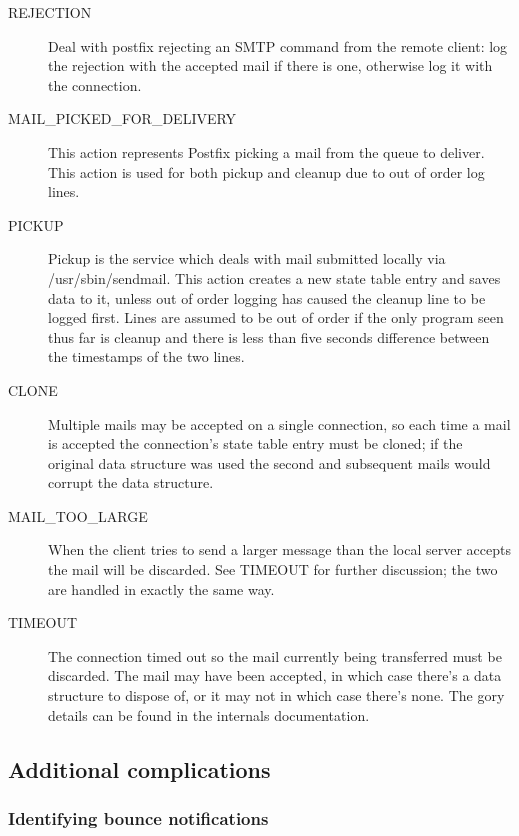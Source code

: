 \documentclass[a4paper,12pt,draft]{article}
\begin{document}
\begin{description}
    \item [REJECTION] Deal with postfix rejecting an SMTP command from the
        remote client: log the rejection with the accepted mail if there is
        one, otherwise log it with the connection.

    \item [MAIL\_PICKED\_FOR\_DELIVERY] This action represents Postfix
        picking a mail from the queue to deliver. This action is used for
        both pickup and cleanup due to out of order log lines.

    \item [PICKUP] Pickup is the service which deals with mail submitted
        locally via /usr/sbin/sendmail. This action creates a new state
        table entry and saves data to it, unless out of order logging has
        caused the cleanup line to be logged first. Lines are assumed to be
        out of order if the only program seen thus far is cleanup and there
        is less than five seconds difference between the timestamps of the
        two lines.

    \item [CLONE] Multiple mails may be accepted on a single connection, so
        each time a mail is accepted the connection's state table entry
        must be cloned; if the original data structure was used the second
        and subsequent mails would corrupt the data structure.

    \item [MAIL\_TOO\_LARGE] When the client tries to send a larger message
        than the local server accepts the mail will be discarded.  See
        TIMEOUT for further discussion; the two are handled in exactly the
        same way.

    \item [TIMEOUT] The connection timed out so the mail currently being
        transferred must be discarded. The mail may have been accepted, in
        which case there's a data structure to dispose of, or it may not in
        which case there's none. The gory details can be found in the
        internals documentation.



\end{description}

\subsection{Additional complications}

\subsubsection{Identifying bounce notifications}
\end{document}
